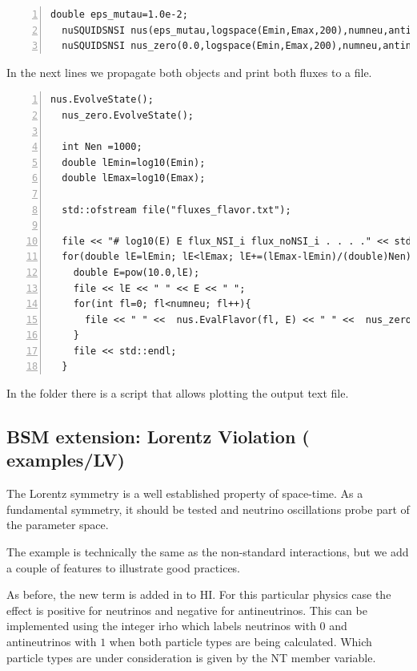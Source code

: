 \documentclass[3p,12pt]{elsarticle}
\newcommand{\ttf}{\ttfamily}
\begin{document}
\begin{lstlisting}[frame=leftline, numbers =
  left,breaklines=true,label = ex:sin1,firstnumber=last]
  double eps_mutau=1.0e-2;
  nuSQUIDSNSI nus(eps_mutau,logspace(Emin,Emax,200),numneu,antineutrino,false);
  nuSQUIDSNSI nus_zero(0.0,logspace(Emin,Emax,200),numneu,antineutrino,false);
\end{lstlisting}

In the next lines we propagate both objects and print both
fluxes to a file.

\begin{lstlisting}[frame=leftline, numbers =
  left,breaklines=true,label = ex:sin1,firstnumber=last]
  nus.EvolveState();
  nus_zero.EvolveState();

  int Nen =1000;
  double lEmin=log10(Emin);
  double lEmax=log10(Emax);
  
  std::ofstream file("fluxes_flavor.txt");

  file << "# log10(E) E flux_NSI_i flux_noNSI_i . . . ." << std::endl;
  for(double lE=lEmin; lE<lEmax; lE+=(lEmax-lEmin)/(double)Nen){
    double E=pow(10.0,lE);
    file << lE << " " << E << " ";
    for(int fl=0; fl<numneu; fl++){
      file << " " <<  nus.EvalFlavor(fl, E) << " " <<  nus_zero.EvalFlavor(fl, E);
    }
    file << std::endl;
  }
\end{lstlisting}

In the folder there is a script that allows plotting the output text
file.


\subsection{BSM extension: Lorentz Violation \textnormal{({\ttf
      examples/LV})}}
\label{sec:LV}
The Lorentz symmetry is a well established property of space-time.
As a fundamental symmetry, it should be tested and neutrino
oscillations probe part of the parameter space.

The example is technically the same as the non-standard interactions,
but we add a couple of features to illustrate good practices.

As before, the new term is added in to {\ttf HI}. For this particular
physics case the effect is positive for neutrinos and negative for
antineutrinos. This can be implemented using the integer {\ttf irho}
which labels neutrinos with $0$ and antineutrinos with $1$ when both particle types are being calculated.
Which particle types are under consideration is given by the {\ttf NT} member variable. 
\end{document}
